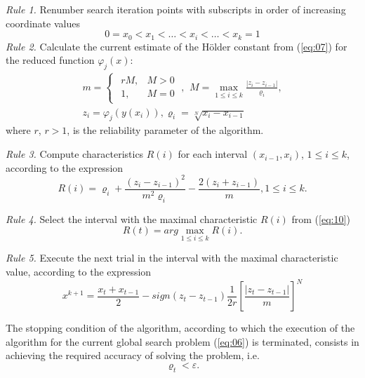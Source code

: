 \documentclass[runningheads]{llncs}
\begin{document}
\textit{Rule 1.} Renumber search iteration points with subscripts in order of increasing coordinate values
\begin{equation}
    \label{eq:08}
    0 = x_0 < x_1 < \dots < x_i < \dots < x_{k} = 1
\end{equation}
\textit{Rule 2.} Calculate the current estimate of the H{\" o}lder constant from (\ref{eq:07}) for the reduced function $\varphi_j (x)$:
\begin{equation}
    \label{eq:9}
		\begin{matrix}
		m=\begin{cases}
				\begin{matrix}
					 r M, & M >0 \\
					 1, & M = 0 
				\end{matrix} \; , 
			\end{cases}
		M = \max_{1 \leq i \leq k} \frac{| z_i - z_{i-1}|}{\varrho_i}, \\
		z_i = \varphi_j( y(x_i) ), \varrho_i=\sqrt[N]{x_i-x_{i-1}}
		\end{matrix}
\end{equation}
where $r$, $r>1$, is the reliability parameter of the algorithm. 

\textit{Rule 3.} Compute characteristics $R(i)$ for each interval $(x_{i-1}, x_i)$, $1\leq i \leq k$, according to the expression
\begin{equation}
    \label{eq:10}
    R(i) = \varrho_i + \frac{(z_i-z_{i-1})^2}{m^2 \varrho_i} - \frac{2 (z_i+z_{i-1})}{m}, 1 \leq i \leq k.
\end{equation}

\textit{Rule 4.} Select the interval with the maximal characteristic $R(i)$ from (\ref{eq:10})
\begin{equation}
    \label{eq:11}
    R(t) = arg\max_{1 \leq i \leq k} {R(i)}.
\end{equation}

\textit{Rule 5.} Execute the next trial in the interval with the maximal characteristic value, according to the expression
\begin{equation}
    \label{eq:12}
    x^{k+1} = \frac{x_t + x_{t-1}}{2} - sign(z_t - z_{t-1}) \frac{1}{2r} \left[\frac{|z_t - z_{t-1}|}{m} \right]^N
\end{equation}

The stopping condition of the algorithm, according to which the execution of the algorithm for the current global search problem (\ref{eq:06}) is terminated, consists in achieving the required accuracy of solving the problem, i.e.
\begin{equation}
    \label{eq:13}
    \varrho_t < \varepsilon.
\end{equation}
\end{document}

